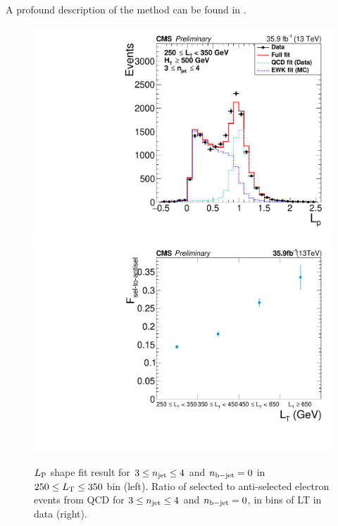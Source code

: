 A profound description of the method can be found in \cite{David}.
\begin{figure}[!hbt]
    \begin{center}
 \includegraphics[width=0.45 \textwidth]{Plots/analysis/QCD/Lp_singleElectronic_st250-350_ht500_njet3-4_nbtagEq0_TemplateFit.pdf}
 \includegraphics[width=0.45 \textwidth]{Plots/analysis/QCD/Fsel.pdf}
  \caption{ \label{fig:QCD} $L_{\rm P}$ shape fit result for $3\leq n_{\rm jet}\leq4$ and $n_{\rm b-jet}=0$ in $250\leq L_{\rm T}\leq350$ bin (left).  Ratio of selected to anti-selected electron events from QCD for $3\leq n_{\rm jet}\leq4$ and $n_{\rm b-jet}=0$, in bins of LT in data (right). 
 }
  \end{center}
\end{figure}
